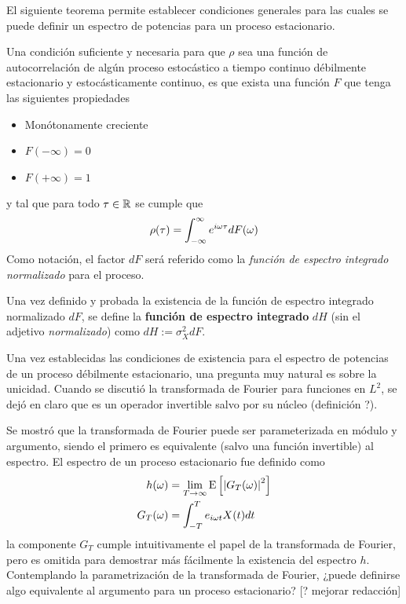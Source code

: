 El siguiente teorema permite establecer condiciones generales para las cuales se puede definir un espectro de potencias para un proceso estacionario.

\begin{teorema}
Una condición suficiente y necesaria para que $\rho$ sea una función de autocorrelación de 
algún proceso estocástico a tiempo continuo \xt débilmente estacionario y 
estocásticamente continuo, es que exista una función $F$ que tenga las siguientes propiedades
\begin{itemize}
\item Monótonamente creciente
\item $F(-\infty) = 0$
\item $F(+\infty) = 1$
\end{itemize}
y tal que para todo $\tau \in \mathbb{R}$ se cumple que
\begin{equation*}
\rho(\tau) = \int_{-\infty}^{\infty} e^{i \omega \tau} dF(\omega)
\end{equation*}
Como notación, el factor $dF$ será referido como la \textit{función de espectro integrado normalizado} para el proceso.
\label{t_wienerkhinchin}
\end{teorema}

Una vez definido y probada la existencia de la función de espectro integrado normalizado $dF$, se define la \textbf{función de espectro integrado} $dH$ (sin el adjetivo \textit{normalizado}) como
$dH := \sigma_X^{2} dF$.


Una vez establecidas las condiciones de existencia para el espectro de potencias de un proceso débilmente estacionario, una pregunta muy natural es sobre la unicidad.
%
Cuando se discutió la transformada de Fourier para funciones en $L^{2}$, se dejó en claro que es un operador invertible salvo por su núcleo (definición ?).

Se mostró que la transformada de Fourier puede ser parameterizada en módulo y argumento, siendo el primero es equivalente (salvo una función invertible) al espectro.
%
El espectro de un proceso estacionario fue definido como
\begin{align*}
h(\omega) &= \lim_{T\rightarrow\infty} \mathrm{E}\left[ \left|  G_T(\omega) \right|^{2} \right] \\
G_T(\omega) &= \int_{-T}^{T} e_{i \omega t} X(t) dt
\end{align*}
la componente $G_T$ cumple intuitivamente el papel de la transformada de Fourier, pero es omitida para demostrar más fácilmente la existencia del espectro $h$. Contemplando la parametrización de la transformada de Fourier, ¿puede definirse algo equivalente al argumento para un proceso estacionario?
%
[? mejorar redacción]

